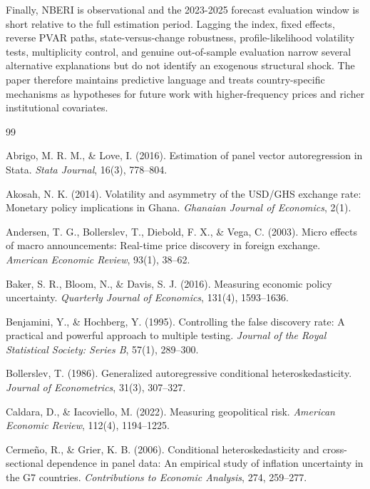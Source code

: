 \documentclass[11pt]{article}
\begin{document}
Finally, NBERI is observational and the 2023-2025 forecast evaluation
window is short relative to the full estimation period. Lagging the
index, fixed effects, reverse PVAR paths, state-versus-change
robustness, profile-likelihood volatility tests, multiplicity control,
and genuine out-of-sample evaluation narrow several alternative
explanations but do not identify an exogenous structural shock. The
paper therefore maintains predictive language and treats
country-specific mechanisms as hypotheses for future work with
higher-frequency prices and richer institutional covariates.

\begin{thebibliography}{99}
\setlength{\itemsep}{0.35em}

Abrigo, M. R. M., \& Love, I. (2016). Estimation of panel vector autoregression in Stata. \textit{Stata Journal}, 16(3), 778--804.

Akosah, N. K. (2014). Volatility and asymmetry of the USD/GHS exchange rate: Monetary policy implications in Ghana. \textit{Ghanaian Journal of Economics}, 2(1).

Andersen, T. G., Bollerslev, T., Diebold, F. X., \& Vega, C. (2003). Micro effects of macro announcements: Real-time price discovery in foreign exchange. \textit{American Economic Review}, 93(1), 38--62.

Baker, S. R., Bloom, N., \& Davis, S. J. (2016). Measuring economic policy uncertainty. \textit{Quarterly Journal of Economics}, 131(4), 1593--1636.

Benjamini, Y., \& Hochberg, Y. (1995). Controlling the false discovery rate: A practical and powerful approach to multiple testing. \textit{Journal of the Royal Statistical Society: Series B}, 57(1), 289--300.

Bollerslev, T. (1986). Generalized autoregressive conditional heteroskedasticity. \textit{Journal of Econometrics}, 31(3), 307--327.

Caldara, D., \& Iacoviello, M. (2022). Measuring geopolitical risk. \textit{American Economic Review}, 112(4), 1194--1225.

Cermeño, R., \& Grier, K. B. (2006). Conditional heteroskedasticity and cross-sectional dependence in panel data: An empirical study of inflation uncertainty in the G7 countries. \textit{Contributions to Economic Analysis}, 274, 259--277.


\end{thebibliography}
\end{document}
